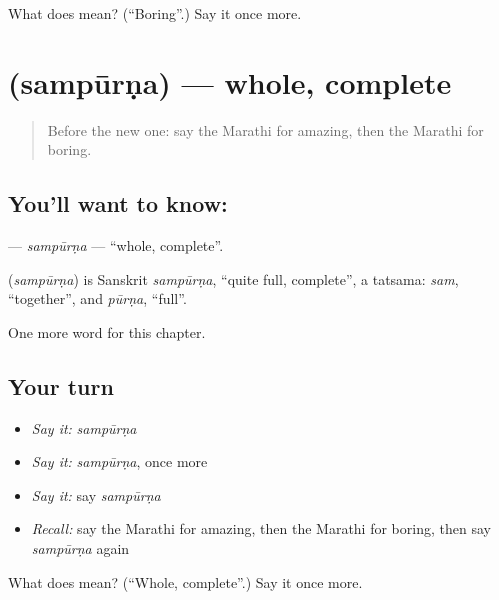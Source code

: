 \begin{tcolorbox}[breakable,colback=teal!4,colframe=teal!35!black,title={Before you move on}]
What does  mean? (\textquotedblleft{}Boring\textquotedblright{}.) Say it once more.
\end{tcolorbox}
\section[\texorpdfstring{\mr{संपूर्ण} (sampūrṇa)}{संपूर्ण (sampūrṇa)}]{ (sampūrṇa) — whole, complete}

\label{lesson:MR-C235-sampurna}



\begin{quote}
Before the new one: say the Marathi for amazing, then the Marathi for boring.
\end{quote}

\subsection*{You'll want to know: }
\textbf{} — \emph{sampūrṇa} — \textquotedblleft{}whole, complete\textquotedblright{}.

\begin{cousinweb}
\textbf{} (\emph{sampūrṇa}) is Sanskrit \emph{sampūrṇa}, \textquotedblleft{}quite full, complete\textquotedblright{}, a tatsama: \emph{sam}, \textquotedblleft{}together\textquotedblright{}, and \emph{pūrṇa}, \textquotedblleft{}full\textquotedblright{}.
\end{cousinweb}

\begin{grammarlens}[title={What you've built}]
One more word for this chapter.
\end{grammarlens}

\subsection*{Your turn}
\begin{itemize}
\raggedright
  \item \emph{Say it:} \emph{sampūrṇa}
  \item \emph{Say it:} \emph{sampūrṇa}, once more
  \item \emph{Say it:} say \emph{sampūrṇa}
  \item \emph{Recall:} say the Marathi for amazing, then the Marathi for boring, then say \emph{sampūrṇa} again
\end{itemize}

\begin{tcolorbox}[breakable,colback=teal!4,colframe=teal!35!black,title={Before you move on}]
What does  mean? (\textquotedblleft{}Whole, complete\textquotedblright{}.) Say it once more.
\end{tcolorbox}
